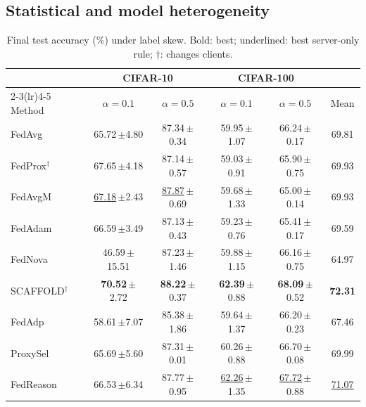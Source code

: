 \documentclass[3p,times,a4paper]{elsarticle}
\newcommand{\pmstd}[1]{\,{\scriptsize$\pm$#1}}
\begin{document}
\subsection{Statistical and model heterogeneity}
\label{sec:res-het}

\begin{table}[t]
\centering
\caption{Final test accuracy (\%) under label skew. Bold: best; underlined: best server-only rule; $\dagger$: changes clients.}
\label{tab:main}
\small
\begin{tabular}{@{}lccccc@{}}
\toprule
 & \multicolumn{2}{c}{CIFAR-10} & \multicolumn{2}{c}{CIFAR-100} & \\
\cmidrule(lr){2-3}\cmidrule(lr){4-5}
Method & $\alpha=0.1$ & $\alpha=0.5$ & $\alpha=0.1$ & $\alpha=0.5$ & Mean \\
\midrule
FedAvg & 65.72\pmstd{4.80} & 87.34\pmstd{0.34} & 59.95\pmstd{1.07} & 66.24\pmstd{0.17} & 69.81 \\
FedProx$^{\dagger}$ & 67.65\pmstd{4.18} & 87.14\pmstd{0.57} & 59.03\pmstd{0.91} & 65.90\pmstd{0.75} & 69.93 \\
FedAvgM & \underline{67.18}\pmstd{2.43} & \underline{87.87}\pmstd{0.69} & 59.68\pmstd{1.33} & 65.00\pmstd{0.14} & 69.93 \\
FedAdam & 66.59\pmstd{3.49} & 87.13\pmstd{0.43} & 59.23\pmstd{0.76} & 65.41\pmstd{0.17} & 69.59 \\
FedNova & 46.59\pmstd{15.51} & 87.23\pmstd{1.46} & 59.88\pmstd{1.15} & 66.16\pmstd{0.75} & 64.97 \\
SCAFFOLD$^{\dagger}$ & \textbf{70.52}\pmstd{2.72} & \textbf{88.22}\pmstd{0.37} & \textbf{62.39}\pmstd{0.88} & \textbf{68.09}\pmstd{0.52} & \textbf{72.31} \\
FedAdp & 58.61\pmstd{7.07} & 85.38\pmstd{1.86} & 59.64\pmstd{1.37} & 66.20\pmstd{0.23} & 67.46 \\
ProxySel & 65.69\pmstd{5.60} & 87.31\pmstd{0.01} & 60.26\pmstd{0.88} & 66.70\pmstd{0.08} & 69.99 \\
FedReason & 66.53\pmstd{6.34} & 87.77\pmstd{0.95} & \underline{62.26}\pmstd{1.35} & \underline{67.72}\pmstd{0.88} & \underline{71.07} \\
\bottomrule
\end{tabular}
\end{table}
\end{document}
